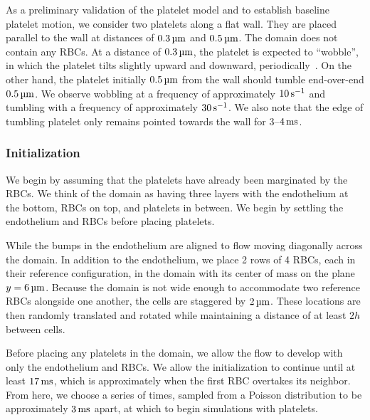 As a preliminary validation of the platelet model and to establish baseline platelet
motion, we consider two platelets along a flat wall. They are placed parallel to the wall
at distances of $0.3\um$ and $0.5\um$. The domain does not contain any RBCs. At a
distance of $0.3\um$, the platelet is expected to ``wobble'', in which the platelet tilts
slightly upward and downward, periodically~\cite{King:2005fv}. On the other hand, the
platelet initially $0.5\um$ from the wall should tumble end-over-end $0.5\um$. We observe
wobbling at a frequency of approximately $10\persec$ and tumbling with a frequency of
approximately $30\persec$. We also note that the edge of tumbling platelet only remains
pointed towards the wall for 3--$4\ms$.

\subsubsection{Initialization}\label{sec:blood-init}

We begin by assuming that the platelets have already been marginated by the RBCs. We
think of the domain as having three layers with the endothelium at the bottom, RBCs on
top, and platelets in between. We begin by settling the endothelium and RBCs before
placing platelets.

While the bumps in the endothelium are aligned to flow moving diagonally across the
domain. In addition to the endothelium, we place 2 rows of 4 RBCs, each in their
reference configuration, in the domain with its center of mass on the plane $y=6\um$.
Because the domain is not wide enough to accommodate two reference RBCs alongside one
another, the cells are staggered by $2\um$. These locations are then randomly translated
and rotated while maintaining a distance of at least $2h$ between cells.

Before placing any platelets in the domain, we allow the flow to develop with only the
endothelium and RBCs. We allow the initialization to continue until at least $17\ms$,
which is approximately when the first RBC overtakes its neighbor. From here, we choose a
series of times, sampled from a Poisson distribution to be approximately $3\ms$ apart, at
which to begin simulations with platelets.

